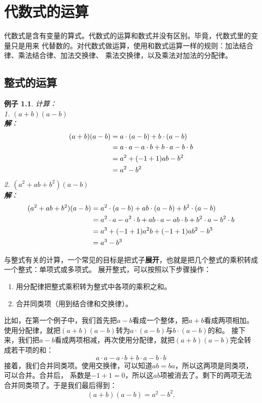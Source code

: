 \documentclass[12pt,UTF8]{ctexbook}
\newtheorem{ex}{例子}[section]
\begin{document}
\chapter{代数式的运算}
代数式是含有变量的算式。代数式的运算和数式并没有区别。毕竟，代数式里的变量只是用来
代替数的。对代数式做运算，使用和数式运算一样的规则：加法结合律、乘法结合律、加法交换律、
乘法交换律，以及乘法对加法的分配律。

\section{整式的运算}
\begin{ex}\label{ex:5-0-0}
    计算：\\
    1. $(a + b)(a - b)$\\
    \textbf{解}：
    \begin{align}
        (a + b)(a - b) &= a\cdot (a - b) + b\cdot (a - b) \notag \\
        &= a\cdot a - a\cdot b + b\cdot a - b\cdot b \notag \\
        &= a^2 + (-1 + 1)ab - b^2 \notag \\
        &= a^2 - b^2 \notag
    \end{align}
    2. $(a^2 + ab + b^2)(a - b)$\\
    \textbf{解}：
    \begin{align}
        (a^2 + ab + b^2)(a - b) &= a^2\cdot (a - b) + ab\cdot (a - b) + b^2\cdot (a - b) \notag \\
        &= a^2\cdot a - a^2\cdot b + ab\cdot a - ab\cdot b + b^2\cdot a - b^2 \cdot b \notag \\
        &= a^3 + (-1 + 1)a^2b + (-1 + 1)ab^2 - b^3\notag \\
        &= a^3 - b^3 \notag
    \end{align}
\end{ex}
与整式有关的计算，一个常见的目标是把式子\textbf{展开}，也就是把几个整式的乘积转成一个整式：单项式或多项式。
展开整式，可以按照以下步骤操作：
\begin{enumerate}
    \item 用分配律把整式乘积转为整式中各项的乘积之和。
    \item 合并同类项（用到结合律和交换律）。
\end{enumerate}
比如，在第一个例子中，我们首先把$a - b$看成一个整体，把$a + b$看成两项相加。
使用分配律，就把$(a + b)(a - b)$转为$a\cdot (a - b)$与$b\cdot (a - b)$的和。
接下来，我们把$a - b$看成两项相减，再次使用分配律，就把$(a + b)(a - b)$完全转成若干项的和：
$$ a\cdot a - a\cdot b + b\cdot a - b\cdot b$$
接着，我们合并同类项。使用交换律，可以知道$ab = ba$，所以这两项是同类项，可以合并。合并后，
系数是$-1 + 1 = 0$，所以这$ab$项被消去了。剩下的两项无法合并同类项了。于是我们最后得到：
$$(a + b)(a - b) = a^2 - b^2. $$
\end{document}
